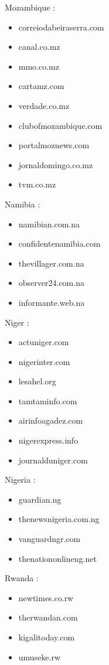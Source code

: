 \documentclass[
  letterpaper,
  DIV=11,
  numbers=noendperiod]{scrartcl}
\providecommand{\tightlist}{%
  \setlength{\itemsep}{0pt}\setlength{\parskip}{0pt}}\usepackage{longtable,booktabs,array}
\begin{document}
Mozambique :

\begin{itemize}
\tightlist
\item
  correiodabeiraserra.com
\item
  canal.co.mz
\item
  mmo.co.mz
\item
  cartamz.com
\item
  verdade.co.mz
\item
  clubofmozambique.com
\item
  portalmoznews.com
\item
  jornaldomingo.co.mz
\item
  tvm.co.mz
\end{itemize}

Namibia :

\begin{itemize}
\tightlist
\item
  namibian.com.na
\item
  confidentenamibia.com
\item
  thevillager.com.na
\item
  observer24.com.na
\item
  informante.web.na
\end{itemize}

Niger :

\begin{itemize}
\tightlist
\item
  actuniger.com
\item
  nigerinter.com
\item
  lesahel.org
\item
  tamtaminfo.com
\item
  airinfoagadez.com
\item
  nigerexpress.info
\item
  journalduniger.com
\end{itemize}

Nigeria :

\begin{itemize}
\tightlist
\item
  guardian.ng
\item
  thenewsnigeria.com.ng
\item
  vanguardngr.com
\item
  thenationonlineng.net
\end{itemize}

Rwanda :

\begin{itemize}
\tightlist
\item
  newtimes.co.rw
\item
  therwandan.com
\item
  kigalitoday.com
\item
  umuseke.rw
\end{itemize}
\end{document}
